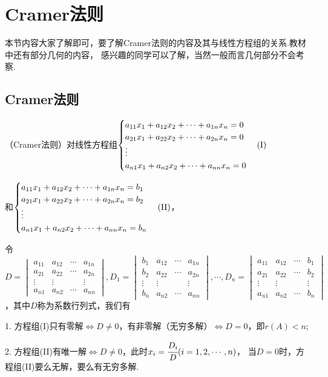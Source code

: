 \section{Cramer法则}
本节内容大家了解即可，要了解Cramer法则的内容及其与线性方程组的关系.教材中还有部分几何的内容，
感兴趣的同学可以了解，当然一般而言几何部分不会考察.
\subsection{Cramer法则}
\begin{theorem}
	（\textup{Cramer}法则）对线性方程组$\begin{cases}
		a_{11}x_1+a_{12}x_2+\cdots+a_{1n}x_n=0 \\
		a_{21}x_1+a_{22}x_2+\cdots+a_{2n}x_n=0 \\
		\vdots \\
		a_{n1}x_1+a_{n2}x_2+\cdots+a_{nn}x_n=0
	\end{cases}(\textup{I})$
	
	和$\begin{cases}
		a_{11}x_1+a_{12}x_2+\cdots+a_{1n}x_n=b_1 \\
		a_{21}x_1+a_{22}x_2+\cdots+a_{2n}x_n=b_2 \\
		\vdots \\
		a_{n1}x_1+a_{n2}x_2+\cdots+a_{nn}x_n=b_n
	\end{cases}(\textup{II})$，

	令$D=\begin{vmatrix}
		a_{11} & a_{12} & \cdots & a_{1n} \\
		a_{21} & a_{22} & \cdots & a_{2n} \\
		\vdots & \vdots &  & \vdots \\
		a_{n1} & a_{n2} & \cdots & a_{nn}
	\end{vmatrix},D_1=\begin{vmatrix}
		b_1 & a_{12} & \cdots & a_{1n} \\
		b_2 & a_{22} & \cdots & a_{2n} \\
		\vdots & \vdots &  & \vdots \\
		b_n & a_{n2} & \cdots & a_{nn}
	\end{vmatrix},\cdots,D_n=\begin{vmatrix}
		a_{11} & a_{12} & \cdots & b_1 \\
		a_{21} & a_{22} & \cdots & b_2 \\
		\vdots & \vdots &  & \vdots \\
		a_{n1} & a_{n2} & \cdots & b_n
	\end{vmatrix}$，其中$D$称为系数行列式，我们有
	
	\textup{1}. 方程组\textup{(I)}只有零解$\iff D \neq 0$，有非零解（无穷多解）$\iff D=0$，即$r(A)<n$\textup{;}

	\textup{2}. 方程组\textup{(II)}有唯一解$\iff D \neq 0$，此时$x_i=\cfrac{D_i}{D}(i=1,2,\cdots,n)$，
	当$D=0$时，方程组\textup{(II)}要么无解，要么有无穷多解.
\end{theorem}
